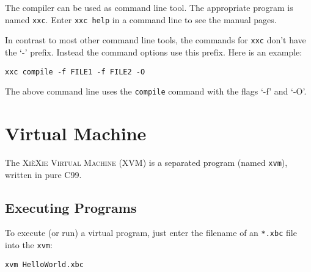 \documentclass{report}
\def\xiexie{\textsc{Xi\`eXie}\xspace}
\def\xxc{\texttt{xxc}\xspace}
\def\xvm{\texttt{xvm}\xspace}
\begin{document}
The compiler can be used as command line tool. The appropriate program is named \xxc.
Enter \texttt{xxc help} in a command line to see the manual pages.

In contrast to most other command line tools, the commands for \xxc don't have the `-' prefix.
Instead the command options use this prefix. Here is an example:
\begin{lstlisting}
xxc compile -f FILE1 -f FILE2 -O
\end{lstlisting}
The above command line uses the \texttt{compile} command with the flags `-f' and `-O'.



\chapter{Virtual Machine}

The \textsc{\xiexie Virtual Machine} (XVM) is a separated program (named \xvm), written in pure C99.



\section{Executing Programs}

To execute (or run) a virtual program, just enter the filename of an \texttt{*.xbc} file into the \xvm:
\begin{lstlisting}
xvm HelloWorld.xbc
\end{lstlisting}
\end{document}
